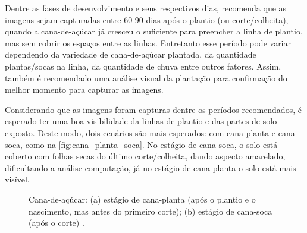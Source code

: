 \documentclass[12pt, a4paper, english, brazil]{article}
\begin{document}
Dentre as fases de desenvolvimento e seus respectivos dias,  recomenda que as imagens sejam capturadas entre 60-90 dias após o plantio (ou corte/colheita), quando a cana-de-açúcar já cresceu o suficiente para preencher a linha de plantio, mas sem cobrir os espaços entre as linhas. Entretanto esse período pode variar dependendo da variedade de cana-de-açúcar plantada, da quantidade plantas/socas na linha, da quantidade de chuva entre outros fatores. Assim, também é recomendado uma análise visual da plantação para confirmação do melhor momento para capturar as imagens.

Considerando que as imagens foram capturas dentre os períodos recomendados, é esperado ter uma boa visibilidade da linhas de plantio e das partes de solo exposto. Deste modo, dois cenários são mais esperados: com cana-planta e cana-soca, como na \autoref{fig:cana_planta_soca}. No estágio de cana-soca, o solo está coberto com folhas secas do último corte/colheita, dando aspecto amarelado, dificultando a análise computação, já no estágio de cana-planta o solo está mais visível.

\begin{figure}[htbp]
    \centering
    \caption{Cana-de-açúcar: (a) estágio de cana-planta (após o plantio e o nascimento, mas antes do primeiro corte); (b) estágio de cana-soca (após o corte) \cite{Silva_2020}.}
    \label{fig:cana_planta_soca}
\end{figure}
\end{document}
